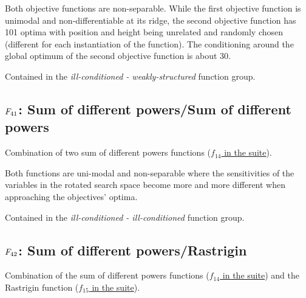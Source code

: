Both objective functions are non-separable.
While the first objective function is unimodal and non-differentiable at
its ridge, the second objective function
has 101 optima with position and height being unrelated and randomly
chosen (different for each instantiation of the function). The
conditioning around the global optimum of the second objective function
is about 30.

Contained in the \emph{ill-conditioned - weakly-structured} function group.



\subsection[\texorpdfstring{\protect\(F_{41}\protect\): Sum of different powers/Sum of different powers}{F41: Sum of different powers/Sum of different powers}]{\texorpdfstring{\protect\(F_{41}\protect\): Sum of different powers/Sum of different powers}{}}
\label{index:f41}\label{index:sum-of-different-powers-sum-of-different-powers}
Combination of two sum of different powers functions
(\href{https://coco.gforge.inria.fr/downloads/download16.00/bbobdocfunctions.pdf\#page=70}{\(f_{14}\) in the \bbob suite}).

Both functions are uni-modal and non-separable where the sensitivities of
the variables in the rotated search space become more and more different
when approaching the objectives' optima.

Contained in the \emph{ill-conditioned - ill-conditioned} function group.



\subsection[\texorpdfstring{\protect\(F_{42}\protect\): Sum of different powers/Rastrigin}{F42: Sum of different powers/Rastrigin}]{\texorpdfstring{\protect\(F_{42}\protect\): Sum of different powers/Rastrigin}{}}
\label{index:f42}\label{index:sum-of-different-powers-rastrigin}
Combination of the sum of different powers functions
(\href{https://coco.gforge.inria.fr/downloads/download16.00/bbobdocfunctions.pdf\#page=70}{\(f_{14}\) in the \bbob suite}) and the Rastrigin function
(\href{https://coco.gforge.inria.fr/downloads/download16.00/bbobdocfunctions.pdf\#page=75}{\(f_{15}\) in the \bbob suite}).

